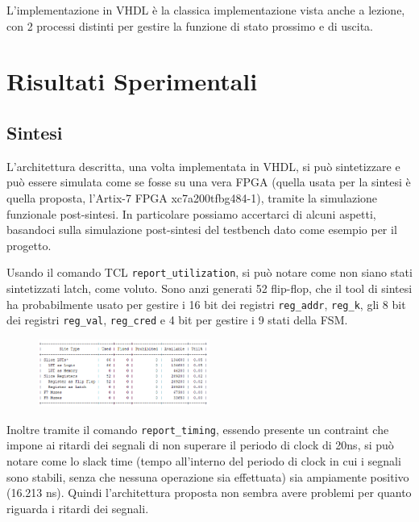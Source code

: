 \documentclass{article}
\begin{document}
L’implementazione in VHDL è la classica implementazione vista anche a lezione, con 2 processi distinti per gestire la funzione di stato prossimo e di uscita.



\section{Risultati Sperimentali}
\subsection{Sintesi}

L’architettura descritta, una volta implementata in VHDL, si può sintetizzare e può essere simulata come se fosse su una vera FPGA (quella usata per la sintesi è quella proposta, l'Artix-7 FPGA xc7a200tfbg484-1), tramite la simulazione funzionale post-sintesi. In particolare possiamo accertarci di alcuni aspetti, basandoci sulla simulazione post-sintesi del testbench dato come esempio per il progetto.

Usando il comando TCL \texttt{report\_utilization},  si può notare come non siano stati sintetizzati latch, come voluto. Sono anzi generati 52 flip-flop, che il tool di sintesi ha probabilmente usato per gestire i 16 bit dei registri \texttt{reg\_addr}, \texttt{reg\_k}, gli 8 bit dei registri \texttt{reg\_val}, \texttt{reg\_cred} e 4 bit per gestire i 9 stati della FSM.

\begin{figure}[h]
    \centering
    \includegraphics[width=0.5\textwidth]{report flip-flop used.png} %
    \label{fig:Report utilization: Numero di flip-flop usati}
\end{figure}

Inoltre tramite il comando \texttt{report\_timing}, essendo presente un contraint che impone ai ritardi dei segnali di non superare il periodo di clock di 20ns, si può notare come lo slack time (tempo all’interno del periodo di clock in cui i segnali sono stabili, senza che nessuna operazione sia effettuata) sia ampiamente positivo (16.213 ns). Quindi l’architettura proposta non sembra avere problemi per quanto riguarda i ritardi dei segnali.
\end{document}
